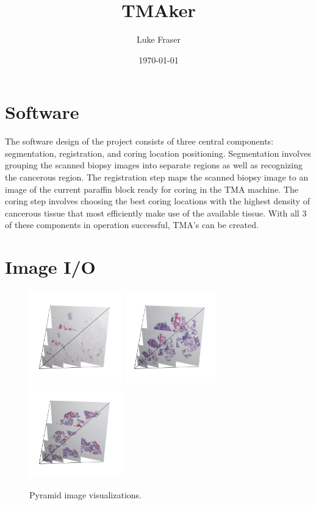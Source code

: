 \documentclass[a4paper,10pt,oneside]{article}
\author{Luke Fraser}
\title{TMAker}
\date{\today}
\begin{document}
\section{Software}
The software design of the project consists of three central components: segmentation, registration, and coring location positioning. Segmentation involves grouping the scanned biopsy images into separate regions as well as recognizing the cancerous region. The registration step maps the scanned biopsy image to an image of the current paraffin block ready for coring in the TMA machine. The coring step involves choosing the best coring locations with the highest density of cancerous tissue that most efficiently make use of the available tissue. With all 3 of these components in operation successful, TMA's can be created.

\section{Image I/O}

\begin{figure}[hbtp]
  \centering	
  \includegraphics[width=4cm]{visualization/Pyramid_PO13-00516A1_1_7_201305171148.png}
  \includegraphics[width=4cm]{visualization/Pyramid_PO13-01710A1_1_5_201312260943.png}
  \includegraphics[width=4cm]{visualization/Pyramid_PO14-00472B13_1_7_201404151132.png}
  \caption{Pyramid image visualizations.}
  \label{fig:pyramidimage}
\end{figure}
\end{document}
